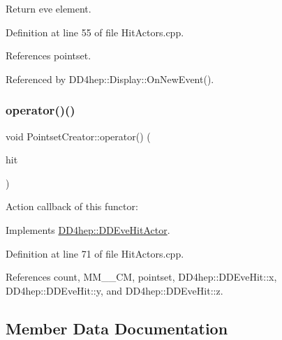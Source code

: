 Return eve element. 



Definition at line 55 of file Hit\+Actors.\+cpp.



References pointset.



Referenced by D\+D4hep\+::\+Display\+::\+On\+New\+Event().

\hypertarget{struct_d_d4hep_1_1_pointset_creator_ac17113e2952d438023d2b9d6a31d6e36}{}\label{struct_d_d4hep_1_1_pointset_creator_ac17113e2952d438023d2b9d6a31d6e36} 
\subsubsection{\texorpdfstring{operator()()}{operator()()}}
{\footnotesize\ttfamily void Pointset\+Creator\+::operator() (\begin{DoxyParamCaption}\item[{const \hyperlink{class_d_d4hep_1_1_d_d_eve_hit}{D\+D\+Eve\+Hit} \&}]{hit }\end{DoxyParamCaption})\hspace{0.3cm}{\ttfamily [virtual]}}



Action callback of this functor\+: 



Implements \hyperlink{struct_d_d4hep_1_1_d_d_eve_hit_actor_a612a0a84bfe41620203555b044019788}{D\+D4hep\+::\+D\+D\+Eve\+Hit\+Actor}.



Definition at line 71 of file Hit\+Actors.\+cpp.



References count, M\+M\+\_\+\_\+\+CM, pointset, D\+D4hep\+::\+D\+D\+Eve\+Hit\+::x, D\+D4hep\+::\+D\+D\+Eve\+Hit\+::y, and D\+D4hep\+::\+D\+D\+Eve\+Hit\+::z.



\subsection{Member Data Documentation}
\hypertarget{struct_d_d4hep_1_1_pointset_creator_a190788682e1cb43e03549f1a03377502}{}\label{struct_d_d4hep_1_1_pointset_creator_a190788682e1cb43e03549f1a03377502} 
